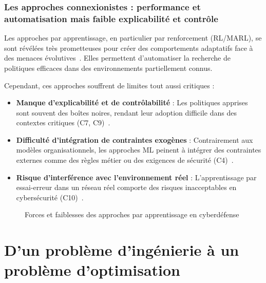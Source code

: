\documentclass[ twoside,openright,titlepage,numbers=noenddot,headinclude,%
                footinclude=true,cleardoublepage=empty,abstractoff, %
                BCOR=5mm,paper=a4,fontsize=11pt,%
                french,american,%
                ]{scrreprt}
\begin{document}
\subsection{Les approches connexionistes : performance et automatisation mais faible explicabilité et contrôle}

Les approches par apprentissage, en particulier par renforcement (RL/MARL), se sont révélées très prometteuses pour créer des comportements adaptatifs face à des menaces évolutives~\cite{Hammar2023}. Elles permettent d'automatiser la recherche de politiques efficaces dans des environnements partiellement connus.

Cependant, ces approches souffrent de limites tout aussi critiques :

\begin{itemize}
    \item \textbf{Manque d'explicabilité et de contrôlabilité} : Les politiques apprises sont souvent des boîtes noires, rendant leur adoption difficile dans des contextes critiques (C7, C9)~\cite{Gunning2019}.
    \item \textbf{Difficulté d'intégration de contraintes exogènes} : Contrairement aux modèles organisationnels, les approches ML peinent à intégrer des contraintes externes comme des règles métier ou des exigences de sécurité (C4)~\cite{Chouldechova2018}.
    \item \textbf{Risque d'interférence avec l'environnement réel} : L'apprentissage par essai-erreur dans un réseau réel comporte des risques inacceptables en cybersécurité (C10)~\cite{kurniawati2011motion}.
\end{itemize}

\begin{figure}[H]
    \centering
    \caption{Forces et faiblesses des approches par apprentissage en cyberdéfense}
    \label{fig:limits_learning}
\end{figure}




\chapter{D'un problème d'ingénierie à un problème d'optimisation}\label{chap:hypotheses}
\end{document}
